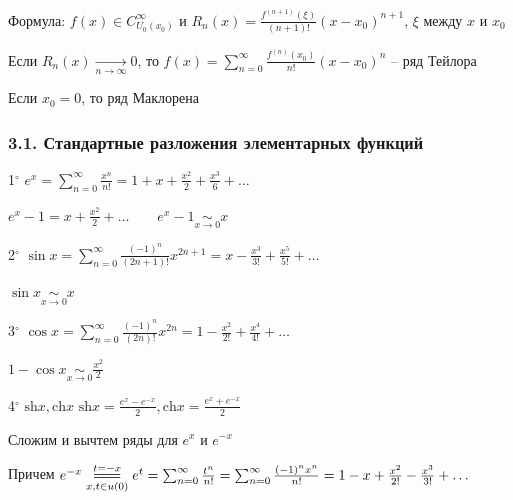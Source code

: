\documentclass[12pt]{article}
\begin{document}
    Формула: $f(x) \in C^\infty_{U_0(x_0)}$ и $R_n(x) = \frac{f^{(n + 1)}(\xi)}{(n + 1)!} (x - x_0)^{n + 1}$, $\xi$ между $x$ и $x_0$

    \hypertarget{taylorsseries}{}

    \begin{MyTheorem}
        \Ths Если $R_n(x) \underset{n \to \infty}{\longrightarrow} 0$, то $f(x) = \sum_{n = 0}^\infty \frac{f^{(n)}(x_0)}{n!} (x - x_0)^n$ -- ряд Тейлора
    \end{MyTheorem}

    \Nota Если $x_0 = 0$, то ряд Маклорена 

    \smallvspace

    \hypertarget{taylorsseriesoffunctions}{}

    \subsubsection{3.1. Стандартные разложения элементарных функций}

    \smallvspace

    1$^\circ$ $e^x = \sum_{n = 0}^\infty \frac{x^n}{n!} = 1 + x + \frac{x^2}{2} + \frac{x^3}{6} + \dots$

    \Notas $e^x - 1 = x + \frac{x^2}{2} + \dots \qquad e^x - 1 \underset{x \to 0}{\sim} x$

    \mediumvspace

    2$^\circ$ $\sin x = \sum_{n = 0}^\infty \frac{(-1)^n}{(2n + 1)!}x^{2n + 1} = x - \frac{x^3}{3!} + \frac{x^5}{5!} + \dots$

    \Notas $\sin x \underset{x \to 0}{\sim} x$

    \mediumvspace

    3$^\circ$ $\cos x = \sum_{n = 0}^\infty \frac{(-1)^n}{(2n)!}x^{2n} = 1 - \frac{x^2}{2!} + \frac{x^4}{4!} + \dots$

    \Notas $1 - \cos x \underset{x \to 0}{\sim} \frac{x^2}{2}$

    \mediumvspace

    4$^\circ$ $\mathrm{sh} x, \mathrm{ch} x$ \hfill \Defs $\mathrm{sh} x = \frac{e^x - e^{-x}}{2}, \mathrm{ch} x = \frac{e^x + e^{-x}}{2}$
    
    Сложим и вычтем ряды для $e^x$ и $e^{-x}$

    Причем $e^{-x} \underset{x, t \in u(0)}{\overset{t = -x}{=\joinrel=\joinrel=}} e^t = \sum_{n = 0}^\infty \frac{t^n}{n!} = \sum_{n = 0}^\infty \frac{(-1)^n x^n}{n!} = 1 - x + \frac{x^2}{2!} - \frac{x^3}{3!} + \dots$
\end{document}

